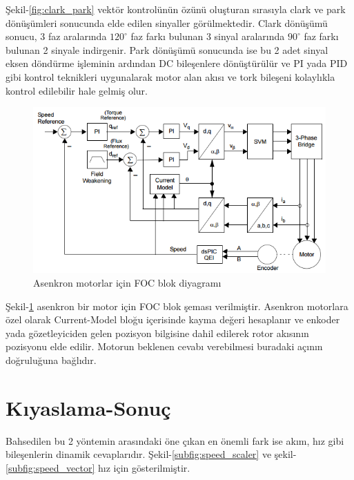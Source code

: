\documentclass[10pt,a4paper]{article}
\begin{document}
	Şekil-\ref{fig:clark_park}  vektör kontrolünün özünü oluşturan sırasıyla clark ve park dönüşümleri sonucunda elde edilen sinyaller görülmektedir. Clark dönüşümü sonucu, 3 faz aralarında  $120^\circ$ faz farkı bulunan 3 sinyal aralarında $90^\circ$ faz farkı bulunan 2 sinyale indirgenir.\newline
	Park dönüşümü sonucunda ise bu 2 adet sinyal eksen döndürme işleminin ardından DC bileşenlere dönüştürülür ve PI yada PID gibi kontrol teknikleri uygunalarak motor alan akısı ve tork bileşeni kolaylıkla kontrol edilebilir hale gelmiş olur.
	
	\begin{figure}[hp]
		\centering	
		\shorthandoff{=}
		\includegraphics[width=0.7\linewidth]{foc_acim.png}
		\shorthandon{=}	
		\caption{Asenkron motorlar için FOC blok diyagramı}
		\label{fig:foc_acim}
	\end{figure}
	
	Şekil-\ref{fig:foc_acim} asenkron bir motor için FOC blok şeması verilmiştir. Asenkron motorlara özel olarak Current-Model bloğu içerisinde kayma değeri hesaplanır ve enkoder yada gözetleyiciden gelen pozisyon bilgisine dahil edilerek rotor akısının pozisyonu elde edilir. Motorun beklenen cevabı verebilmesi buradaki açının doğruluğuna bağlıdır.
	\newpage
	\section{Kıyaslama-Sonuç}
	Bahsedilen bu 2 yöntemin arasındaki öne çıkan en önemli fark ise akım, hız gibi bileşenlerin dinamik cevaplarıdır. Şekil-\ref{subfig:speed_scaler} ve şekil-\ref{subfig:speed_vector} hız için gösterilmiştir. 
	
\end{document}
